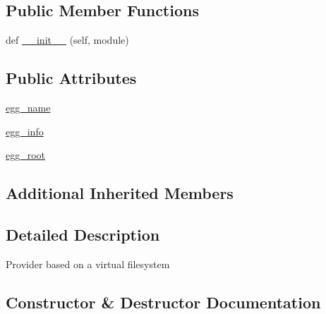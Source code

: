 \subsection*{Public Member Functions}
\begin{DoxyCompactItemize}
\item 
def \hyperlink{classpip_1_1__vendor_1_1pkg__resources_1_1EggProvider_a3dbc646b6c9c258c0e1108249c6b0322}{\+\_\+\+\_\+init\+\_\+\+\_\+} (self, module)
\end{DoxyCompactItemize}
\subsection*{Public Attributes}
\begin{DoxyCompactItemize}
\item 
\hyperlink{classpip_1_1__vendor_1_1pkg__resources_1_1EggProvider_a0bd9ede319fe02e2f7640372f5581435}{egg\+\_\+name}
\item 
\hyperlink{classpip_1_1__vendor_1_1pkg__resources_1_1EggProvider_adc320e7c268ced7d14b22dce780c673d}{egg\+\_\+info}
\item 
\hyperlink{classpip_1_1__vendor_1_1pkg__resources_1_1EggProvider_af9cf88ad0344c406f642b8a189ec8fd8}{egg\+\_\+root}
\end{DoxyCompactItemize}
\subsection*{Additional Inherited Members}


\subsection{Detailed Description}
\begin{DoxyVerb}Provider based on a virtual filesystem\end{DoxyVerb}
 

\subsection{Constructor \& Destructor Documentation}
\mbox{\label{classpip_1_1__vendor_1_1pkg__resources_1_1EggProvider_a3dbc646b6c9c258c0e1108249c6b0322}} 
